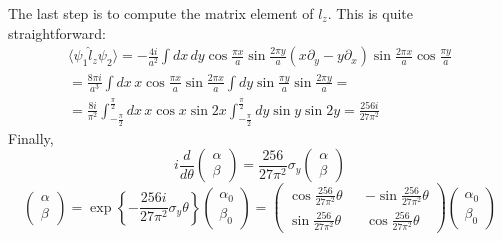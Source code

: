 \documentclass{article}
\begin{document}
The last step is to compute the matrix element of $l_z$. This is quite straightforward:
\begin{multline}
    \langle \psi_1 \hat{l}_z \psi_2 \rangle = 
     -\frac{4i}{a^2} \int dx\,dy \cos{\frac{\pi x}{a}} \sin{\frac{2\pi y}{a}}
                                 (x\partial_y - y\partial_x)
                                 \sin{\frac{2\pi x}{a}}\cos{\frac{\pi y}{a}}\\
    = \frac{8\pi i}{a^3} \int dx\, x \cos{\frac{\pi x}{a}}\sin{\frac{2\pi x}{a}} 
                         \int dy \sin{\frac{\pi y}{a}} 
                                 \sin{\frac{2\pi y}{a}} =\\
    =  \frac{8i}{\pi^2} \int_{-\frac{\pi}{2}}^{\frac{\pi}{2}} dx\, x \cos{x}\sin{2x} 
                        \int_{-\frac{\pi}{2}}^{\frac{\pi}{2}} dy \sin{y} 
                                 \sin{2y} = \frac{256i}{27\pi^2}
\end{multline}
Finally,
\begin{equation}
   i\frac{d}{d\theta}
         \begin{pmatrix}
           \alpha \\
           \beta
         \end{pmatrix}
        =\frac{256}{27\pi^2} \sigma_y
         \begin{pmatrix}
           \alpha \\
           \beta
         \end{pmatrix}
\end{equation}
\begin{equation}
        \begin{pmatrix}
          \alpha \\
          \beta
        \end{pmatrix} = 
        \exp\left\{-\frac{256i}{27\pi^2} \sigma_y \theta\right\}
        \begin{pmatrix}
          \alpha_0 \\
          \beta_0
        \end{pmatrix} = 
        \begin{pmatrix}
            \cos{\frac{256}{27\pi^2}\theta} &&
            -\sin{\frac{256}{27\pi^2}\theta} \\
            \sin{\frac{256}{27\pi^2}\theta} &&
            \cos{\frac{256}{27\pi^2}\theta}
        \end{pmatrix}
        \begin{pmatrix}
          \alpha_0 \\
          \beta_0
        \end{pmatrix}
\end{equation}
\end{document}
